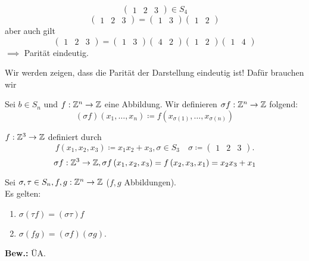 \begin{subexample}
	\[
		\begin{pmatrix} 1 & 2 & 3 \end{pmatrix} \in S_4
	\]
	\[
		\begin{pmatrix} 1 & 2 & 3 \end{pmatrix} = \begin{pmatrix} 1 & 3 \end{pmatrix} \begin{pmatrix} 1 & 2 \end{pmatrix} 
	\]
	aber auch gilt
	\[
		\begin{pmatrix} 1 & 2 & 3 \end{pmatrix} = \begin{pmatrix} 1 & 3 \end{pmatrix} \begin{pmatrix} 4 & 2 \end{pmatrix} \begin{pmatrix} 1 & 2 \end{pmatrix} \begin{pmatrix} 1 & 4 \end{pmatrix} 
	\]
	$ \implies  $ Parität eindeutig.
\end{subexample}

Wir werden zeigen, dass die Parität der Darstellung eindeutig ist!
Dafür brauchen wir

\begin{subdefinition}
	Sei $ b \in S_n $ und $ f : \mathbb{Z} ^n \to \mathbb{Z} $ eine Abbildung.
	Wir definieren $ \sigma f : \mathbb{Z} ^n \to \mathbb{Z} $ folgend:
	\[
		(\sigma f) (x_1, \dotsc, x_n) \coloneqq f( x_{\sigma(1)} , \dotsc, x_{\sigma(n)} )
	\]
\end{subdefinition}

\begin{subexample}
	$ f : \mathbb{Z} ^3 \to \mathbb{Z}  $ definiert durch
	\[
		f\left( x_1, x_2, x_3 \right) \coloneqq x_1x_2 + x_3, \sigma \in S_3 \quad \sigma \coloneqq \begin{pmatrix} 1 & 2 & 3 \end{pmatrix} .
	\]
	\[
		\sigma f : \mathbb{Z} ^3 \to \mathbb{Z} , \sigma f\left( x_1, x_2, x_3 \right) = f\left( x_2, x_3, x_1 \right) = x_2 x_3 + x_1
	\]
\end{subexample}

\begin{sublemma}
	Sei $ \sigma, \tau \in S_n, f, g : \mathbb{Z} ^n \to \mathbb{Z} $ ($ f, g $ Abbildungen).\\
	Es gelten:
	\begin{enumerate}[label=(\roman*)]
		\item $ \sigma( \tau f ) = (\sigma \tau) f $
		\item $ \sigma (f g) = (\sigma f) (\sigma g) $.
	\end{enumerate}
	\textbf{Bew.:} ÜA.
\end{sublemma}

